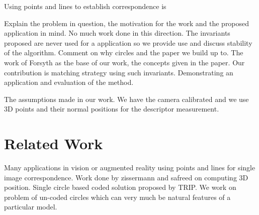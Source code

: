 \documentclass{bmvc2k}
\begin{document}
Using points and lines to establish correspondence is 

Explain the problem in question, the motivation for the work and the proposed application in mind.
No much work done in this direction. The invariants proposed are never used for a application so we provide use and discuss stability of the algorithm. Comment on why circles and the paper we build up to. 
The work of Forsyth as the base of our work, the concepts given in the paper. Our contribution is matching strategy using such invariants. Demonstrating an application and evaluation of the method. 

The assumptions made in our work. We have the camera calibrated and we use 3D points and their normal positions for the descriptor measurement. 




\section{Related Work}

Many applications in vision or augmented reality using points and lines for single image correspondence. 
Work done by zissermann and safreed on computing 3D position. Single circle based coded solution proposed by TRIP. 
We work on problem of un-coded circles which can very much be natural features of a particular model.  
\end{document}
